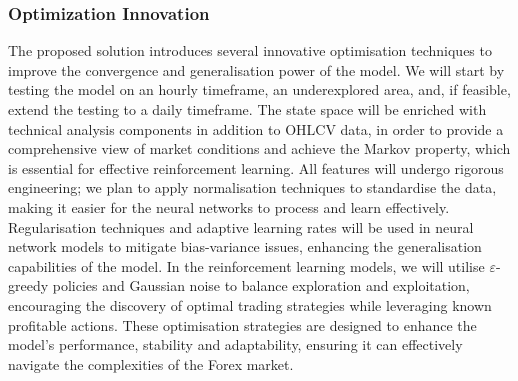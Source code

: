 \subsubsection{Optimization Innovation}

The proposed solution introduces several innovative optimisation techniques to improve the convergence and generalisation power of the model. We will start by testing the model on an hourly timeframe, an underexplored area, and, if feasible, extend the testing to a daily timeframe. The state space will be enriched with technical analysis components in addition to OHLCV data, in order to provide a comprehensive view of market conditions and achieve the Markov property, which is essential for effective reinforcement learning. All features will undergo rigorous engineering; we plan to apply normalisation techniques to standardise the data, making it easier for the neural networks to process and learn effectively. Regularisation techniques and adaptive learning rates will be used in neural network models to mitigate bias-variance issues, enhancing the generalisation capabilities of the model. In the reinforcement learning models, we will utilise \(\varepsilon\)-greedy policies and Gaussian noise to balance exploration and exploitation, encouraging the discovery of optimal trading strategies while leveraging known profitable actions. These optimisation strategies are designed to enhance the model's performance, stability and adaptability, ensuring it can effectively navigate the complexities of the Forex market.